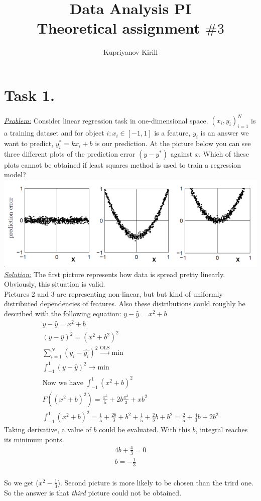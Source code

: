 \documentclass[a4paper,12pt]{article}
\author{Kupriyanov Kirill}
\title{Data Analysis PI\\Theoretical assignment $\#3$}
\date{}
\begin{document}
\maketitle
\thispagestyle{empty}
\newpage
\section*{Task 1.}
\underline{\textit{Problem:}} Consider linear regression task in
one-dimensional space. \({(x_i , y_i)}^N_{i=1}\) is a training dataset and
for object \(i: x_i \in [-1, 1]\) is a feature, $y_i$ is an answer we want to
predict, $y_i^*=kx_i+b$ is our prediction. At the picture below you can see
three different plots of the prediction error \((y - y^*)\) against $x$. Which of
these plots cannot be obtained if least squares method is used to train a
regression model?\\
\includegraphics[width=\textwidth]{1}
\newline
\underline{\textit{Solution:}} The first picture represents how data is spread pretty linearly. Obviously, this situation is valid.\\
Pictures 2 and 3 are representing non-linear, but but kind of uniformly
distributed dependencies of features. Also these distributions could roughly be described with the following equation: \(y - \hat{y} = x^2+b\)
\begin{gather}
    y - \hat{y} = x^2 + b\\
    (y - \hat{y})^2 = (x^2 + b^2)^2\\
    \sum^{N}_{i = 1}{(y_i - \hat{y_i})^2} \overset{\text{OLS} }{\rightarrow} \text{min}\\
    \int_{-1}^{1} (y - \hat{y})^2  \rightarrow \text{min}\\
    \text{Now we have } \int_{-1}^{1}(x^2+b)^2\\
    F((x^2+b)^2) = \frac{x^5}{5} + 2b\frac{x^3}{3} + xb^2\\
    \int_{-1}^{1}(x^2 + b)^2 = \frac{1}{5}+\frac{2b}{3} + b^2 + \frac{1}{5} + \frac{2}{3}b + b^2 = \frac{2}{5} + \frac{4}{3}b + 2b^2
\end{gather}
Taking derivative, a value of $b$ could be evaluated. With this $b$, integral reaches its minimum ponts.
\begin{gather}
    4b + \frac{4}{3} = 0\\
    b = -\frac{1}{3}
\end{gather}\\
So we get  ($x^2 - \frac{1}{3}$). Second picture is more likely to be chosen
than the trird one.\\
\newline
So the answer is that \textit{third} picture could not be obtained.
\end{document}

